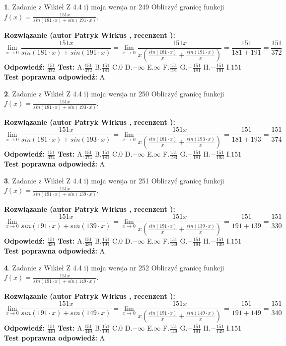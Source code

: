 \documentclass[12pt, a4paper]{article}
\theoremstyle{definition} %
\newtheorem{zad}{}
\newcommand{\zadStart}[1]{\begin{zad}#1\newline}
\newcommand{\zadStop}{\end{zad}}
\newcommand{\rozwStart}[2]{\noindent \textbf{Rozwiązanie (autor #1 , recenzent #2): }\newline}
\newcommand{\rozwStop}{\newline}
\newcommand{\odpStart}{\noindent \textbf{Odpowiedź:}\newline}
\newcommand{\odpStop}{\newline}
\newcommand{\testStart}{\noindent \textbf{Test:}\newline}
\newcommand{\testStop}{\newline}
\newcommand{\kluczStart}{\noindent \textbf{Test poprawna odpowiedź:}\newline}
\newcommand{\kluczStop}{\newline}
\begin{document}
\zadStart{Zadanie z Wikieł Z 4.4 i) moja wersja nr 249}
Obliczyć granicę funkcji $f(x)=\frac{151x}{sin(181\cdot x) +sin(191\cdot x)}$.
\zadStop
\rozwStart{Patryk Wirkus}{}
$$\lim\limits_{x\to 0}\frac{151x}{sin(181\cdot x) +sin(191\cdot x)}=\lim\limits_{x\to 0}\frac{151x}{x(\frac{sin(181\cdot x)}{x}+\frac{sin(191\cdot x)}{x})}=\frac{151}{181+191} = \frac{151}{372}$$
\rozwStop
\odpStart
$\frac{151}{372}$
\odpStop
\testStart
A.$\frac{151}{372}$
B.$\frac{151}{181}$
C.$0$
D.$-\infty$
E.$\infty$
F.$\frac{151}{191}$
G.$-\frac{151}{181}$
H.$-\frac{151}{191}$
I.$151$
\testStop
\kluczStart
A
\kluczStop



\zadStart{Zadanie z Wikieł Z 4.4 i) moja wersja nr 250}
Obliczyć granicę funkcji $f(x)=\frac{151x}{sin(181\cdot x) +sin(193\cdot x)}$.
\zadStop
\rozwStart{Patryk Wirkus}{}
$$\lim\limits_{x\to 0}\frac{151x}{sin(181\cdot x) +sin(193\cdot x)}=\lim\limits_{x\to 0}\frac{151x}{x(\frac{sin(181\cdot x)}{x}+\frac{sin(193\cdot x)}{x})}=\frac{151}{181+193} = \frac{151}{374}$$
\rozwStop
\odpStart
$\frac{151}{374}$
\odpStop
\testStart
A.$\frac{151}{374}$
B.$\frac{151}{181}$
C.$0$
D.$-\infty$
E.$\infty$
F.$\frac{151}{193}$
G.$-\frac{151}{181}$
H.$-\frac{151}{193}$
I.$151$
\testStop
\kluczStart
A
\kluczStop



\zadStart{Zadanie z Wikieł Z 4.4 i) moja wersja nr 251}
Obliczyć granicę funkcji $f(x)=\frac{151x}{sin(191\cdot x) +sin(139\cdot x)}$.
\zadStop
\rozwStart{Patryk Wirkus}{}
$$\lim\limits_{x\to 0}\frac{151x}{sin(191\cdot x) +sin(139\cdot x)}=\lim\limits_{x\to 0}\frac{151x}{x(\frac{sin(191\cdot x)}{x}+\frac{sin(139\cdot x)}{x})}=\frac{151}{191+139} = \frac{151}{330}$$
\rozwStop
\odpStart
$\frac{151}{330}$
\odpStop
\testStart
A.$\frac{151}{330}$
B.$\frac{151}{191}$
C.$0$
D.$-\infty$
E.$\infty$
F.$\frac{151}{139}$
G.$-\frac{151}{191}$
H.$-\frac{151}{139}$
I.$151$
\testStop
\kluczStart
A
\kluczStop



\zadStart{Zadanie z Wikieł Z 4.4 i) moja wersja nr 252}
Obliczyć granicę funkcji $f(x)=\frac{151x}{sin(191\cdot x) +sin(149\cdot x)}$.
\zadStop
\rozwStart{Patryk Wirkus}{}
$$\lim\limits_{x\to 0}\frac{151x}{sin(191\cdot x) +sin(149\cdot x)}=\lim\limits_{x\to 0}\frac{151x}{x(\frac{sin(191\cdot x)}{x}+\frac{sin(149\cdot x)}{x})}=\frac{151}{191+149} = \frac{151}{340}$$
\rozwStop
\odpStart
$\frac{151}{340}$
\odpStop
\testStart
A.$\frac{151}{340}$
B.$\frac{151}{191}$
C.$0$
D.$-\infty$
E.$\infty$
F.$\frac{151}{149}$
G.$-\frac{151}{191}$
H.$-\frac{151}{149}$
I.$151$
\testStop
\kluczStart
A
\kluczStop
\end{document}
